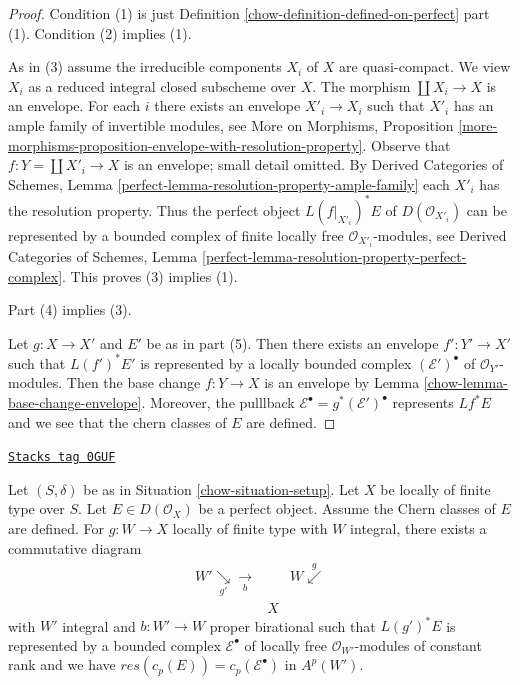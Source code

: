 \begin{proof}

Condition (1) is just Definition \ref{chow-definition-defined-on-perfect} part (1).
Condition (2) implies (1).

\medskip\noindent
As in (3) assume the irreducible components $X_i$ of $X$ are quasi-compact.
We view $X_i$ as a reduced integral closed subscheme over $X$.
The morphism $\coprod X_i \to X$ is an envelope. For each $i$ there
exists an envelope $X'_i \to X_i$ such that $X'_i$ has an ample family
of invertible modules, see More on Morphisms, Proposition
\ref{more-morphisms-proposition-envelope-with-resolution-property}.
Observe that $f : Y = \coprod X'_i \to X$ is an envelope; small detail omitted.
By Derived Categories of Schemes, Lemma
\ref{perfect-lemma-resolution-property-ample-family}
each $X'_i$ has the resolution property.
Thus the perfect object $L(f|_{X'_i})^*E$ of $D(\mathcal{O}_{X'_i})$
can be represented by a bounded
complex of finite locally free $\mathcal{O}_{X'_i}$-modules, see
Derived Categories of Schemes, Lemma
\ref{perfect-lemma-resolution-property-perfect-complex}.
This proves (3) implies (1).

\medskip\noindent
Part (4) implies (3).

\medskip\noindent
Let $g : X \to X'$ and $E'$ be as in part (5). Then there exists an
envelope $f' : Y' \to X'$ such that $L(f')^*E'$ is represented by a
locally bounded complex $(\mathcal{E}')^\bullet$ of $\mathcal{O}_{Y'}$-modules.
Then the base change $f : Y \to X$ is an envelope by
Lemma \ref{chow-lemma-base-change-envelope}. Moreover, the pulllback
$\mathcal{E}^\bullet = g^*(\mathcal{E}')^\bullet$ represents $Lf^*E$
and we see that the chern classes of $E$ are defined.
\end{proof}

\begin{lemma}
\label{chow-lemma-chern-classes-computed}
\href{https://stacks.math.columbia.edu/tag/0GUF}{\texttt{Stacks tag 0GUF}}

Let $(S, \delta)$ be as in Situation \ref{chow-situation-setup}.
Let $X$ be locally of finite type over $S$. Let $E \in D(\mathcal{O}_X)$
be a perfect object. Assume the Chern classes of $E$ are defined.
For $g : W \to X$ locally of finite type with $W$ integral, there exists
a commutative diagram
$$
\begin{array}{ccc}W' \underset{g'}{\searrow}\underset{b}{\longrightarrow} &  & W \overset{g}{\swarrow} \\  & X & \end{array}
$$
with $W'$ integral and $b : W' \to W$ proper birational such that $L(g')^*E$
is represented by a bounded complex $\mathcal{E}^\bullet$ of locally free
$\mathcal{O}_{W'}$-modules of constant rank and we have
$res(c_p(E)) = c_p(\mathcal{E}^\bullet)$ in $A^p(W')$.
\end{lemma}

